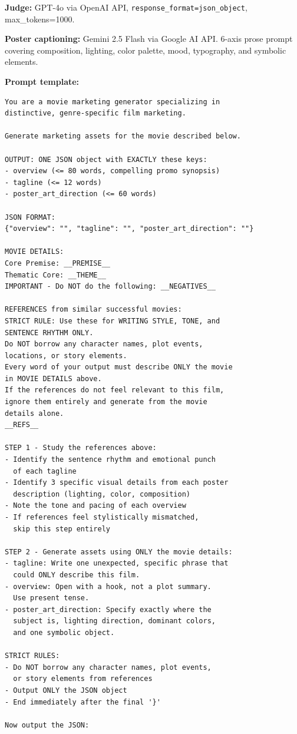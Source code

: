 \documentclass[10pt,twocolumn]{article}
\begin{document}
\textbf{Judge:} GPT-4o via OpenAI API, \texttt{response\_format=json\_object}, max\_tokens=1000.

\textbf{Poster captioning:} Gemini 2.5 Flash via Google AI API. 6-axis prose prompt covering composition, lighting, color palette, mood, typography, and symbolic elements.

\textbf{Prompt template:}
\begin{verbatim}
You are a movie marketing generator specializing in 
distinctive, genre-specific film marketing.

Generate marketing assets for the movie described below.

OUTPUT: ONE JSON object with EXACTLY these keys:
- overview (<= 80 words, compelling promo synopsis)
- tagline (<= 12 words)
- poster_art_direction (<= 60 words)

JSON FORMAT:
{"overview": "", "tagline": "", "poster_art_direction": ""}

MOVIE DETAILS:
Core Premise: __PREMISE__
Thematic Core: __THEME__
IMPORTANT - Do NOT do the following: __NEGATIVES__

REFERENCES from similar successful movies:
STRICT RULE: Use these for WRITING STYLE, TONE, and 
SENTENCE RHYTHM ONLY.
Do NOT borrow any character names, plot events, 
locations, or story elements.
Every word of your output must describe ONLY the movie 
in MOVIE DETAILS above.
If the references do not feel relevant to this film, 
ignore them entirely and generate from the movie 
details alone.
__REFS__

STEP 1 - Study the references above:
- Identify the sentence rhythm and emotional punch 
  of each tagline
- Identify 3 specific visual details from each poster 
  description (lighting, color, composition)
- Note the tone and pacing of each overview
- If references feel stylistically mismatched, 
  skip this step entirely

STEP 2 - Generate assets using ONLY the movie details:
- tagline: Write one unexpected, specific phrase that 
  could ONLY describe this film.
- overview: Open with a hook, not a plot summary. 
  Use present tense.
- poster_art_direction: Specify exactly where the 
  subject is, lighting direction, dominant colors, 
  and one symbolic object.

STRICT RULES:
- Do NOT borrow any character names, plot events, 
  or story elements from references
- Output ONLY the JSON object
- End immediately after the final '}'

Now output the JSON:
\end{verbatim}
\end{document}
